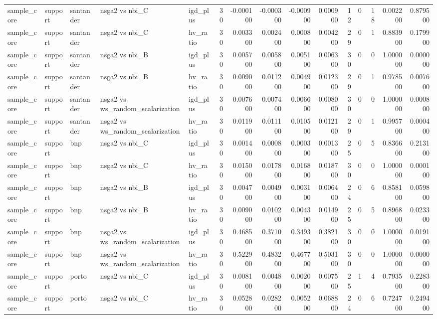 \begin{landscape}
\begin{longtable}{lllllrrrrrrrrrr}
sample\_core & support & santander & nsga2 vs nbi\_C & igd\_plus & 30 & -0.000100 & -0.000300 & -0.000900 & 0.000900 & 12 & 0 & 18 & 0.002200 & 0.879500 \\
sample\_core & support & santander & nsga2 vs nbi\_C & hv\_ratio & 30 & 0.003300 & 0.002400 & 0.000800 & 0.004200 & 29 & 0 & 1 & 0.883900 & 0.179900 \\
sample\_core & support & santander & nsga2 vs nbi\_B & igd\_plus & 30 & 0.005700 & 0.005800 & 0.005100 & 0.006300 & 30 & 0 & 0 & 1.000000 & 0.000000 \\
sample\_core & support & santander & nsga2 vs nbi\_B & hv\_ratio & 30 & 0.009000 & 0.011200 & 0.004900 & 0.012300 & 29 & 0 & 1 & 0.978500 & 0.007600 \\
sample\_core & support & santander & nsga2 vs ws\_random\_scalarization & igd\_plus & 30 & 0.007600 & 0.007400 & 0.006600 & 0.008000 & 30 & 0 & 0 & 1.000000 & 0.000800 \\
sample\_core & support & santander & nsga2 vs ws\_random\_scalarization & hv\_ratio & 30 & 0.011900 & 0.011100 & 0.010500 & 0.012100 & 29 & 0 & 1 & 0.995700 & 0.000400 \\
sample\_core & support & bnp & nsga2 vs nbi\_C & igd\_plus & 30 & 0.001400 & 0.000800 & 0.000300 & 0.001300 & 25 & 0 & 5 & 0.836600 & 0.213100 \\
sample\_core & support & bnp & nsga2 vs nbi\_C & hv\_ratio & 30 & 0.015000 & 0.017800 & 0.016800 & 0.018700 & 30 & 0 & 0 & 1.000000 & 0.000100 \\
sample\_core & support & bnp & nsga2 vs nbi\_B & igd\_plus & 30 & 0.004700 & 0.004900 & 0.003100 & 0.006400 & 24 & 0 & 6 & 0.858100 & 0.059800 \\
sample\_core & support & bnp & nsga2 vs nbi\_B & hv\_ratio & 30 & 0.009000 & 0.010200 & 0.004300 & 0.014900 & 25 & 0 & 5 & 0.896800 & 0.023300 \\
sample\_core & support & bnp & nsga2 vs ws\_random\_scalarization & igd\_plus & 30 & 0.468500 & 0.371000 & 0.349300 & 0.382100 & 30 & 0 & 0 & 1.000000 & 0.019100 \\
sample\_core & support & bnp & nsga2 vs ws\_random\_scalarization & hv\_ratio & 30 & 0.522900 & 0.483200 & 0.467700 & 0.503100 & 30 & 0 & 0 & 1.000000 & 0.000000 \\
sample\_core & support & porto & nsga2 vs nbi\_C & igd\_plus & 30 & 0.008100 & 0.004800 & 0.002000 & 0.007500 & 25 & 1 & 4 & 0.793500 & 0.228300 \\
sample\_core & support & porto & nsga2 vs nbi\_C & hv\_ratio & 30 & 0.052800 & 0.028200 & 0.005200 & 0.068800 & 24 & 0 & 6 & 0.724700 & 0.249400 \\

\end{longtable}
\end{landscape}
